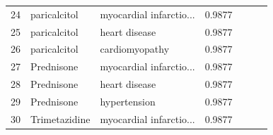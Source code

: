 \begin{table}[ht]
\begin{tabular}{rllcccc}
24 & paricalcitol & myocardial infarctio... & 0.9877 &  &  \\
25 & paricalcitol & heart disease & 0.9877 &  &  \\
26 & paricalcitol & cardiomyopathy & 0.9877 &  &  \\
27 & Prednisone & myocardial infarctio... & 0.9877 &  &  \\
28 & Prednisone & heart disease & 0.9877 &  &  \\
29 & Prednisone & hypertension & 0.9877 &  &  \\
30 & Trimetazidine & myocardial infarctio... & 0.9877 &  &  \\
\bottomrule
\end{tabular}
\end{table}
